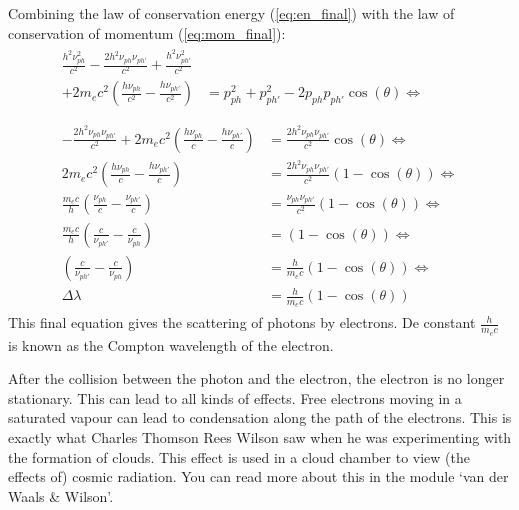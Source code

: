 \documentclass[12pt,a4paper]{article}
\numberwithin{equation}{section}
\numberwithin{figure}{section}
\numberwithin{table}{section}
\begin{document}
Combining the law of conservation energy (\ref{eq:en_final}) with the law of conservation of momentum (\ref{eq:mom_final}):
\begin{align}
\begin{aligned} \nonumber
\frac{h^2\nu^2_{ph}}{c^2} - \frac{2h^2\nu_{ph}\nu_{ph'}}{c^2} + \frac{h^2\nu^2_{ph'}}{c^2} & \\
+ 2m_ec^2 \left( \frac{h\nu_{ph}}{c^2} - \frac{h\nu_{ph'}}{c^2} \right) & = p^2_{ph} + p^2_{ph'} - 2p_{ph}p_{ph'}\cos(\theta) \Longleftrightarrow \\
\end{aligned} \\ 
\begin{aligned}
- \frac{2h^2\nu_{ph}\nu_{ph'}}{c^2} + 2m_ec^2 \left( \frac{h\nu_{ph}}{c} - \frac{h\nu_{ph'}}{c} \right) &= \frac{2h^2 \nu_{ph}\nu_{ph'}}{c^2} \cos(\theta) \Longleftrightarrow\\
2m_ec^2 \left( \frac{h\nu_{ph}}{c} - \frac{h\nu_{ph'}}{c} \right) &= \frac{2h^2 \nu_{ph}\nu_{ph'}}{c^2} \left( 1-\cos(\theta) \right) \Longleftrightarrow\\
\frac{m_ec}{h} \left( \frac{\nu_{ph}}{c} - \frac{\nu_{ph'}}{c} \right) &= \frac{\nu_{ph}\nu_{ph'}}{c^2} \left( 1-\cos(\theta) \right) \Longleftrightarrow\\
\frac{m_ec}{h} \left( \frac{c}{\nu_{ph'}} - \frac{c}{\nu_{ph}} \right) &= \left(  1-\cos(\theta) \right) \Longleftrightarrow\\
\left( \frac{c}{\nu_{ph'}} - \frac{c}{\nu_{ph}} \right) &= \frac{h}{m_ec} \left(  1-\cos(\theta) \right) \Longleftrightarrow\\
\Delta \lambda &= \frac{h}{m_ec} \left( 1-\cos(\theta) \right)
\end{aligned}
\end{align}
This final equation gives the scattering of photons by electrons. De constant $\frac{h}{m_ec}$ is known as the Compton wavelength of the electron.

After the collision between the photon and the electron, the electron is no longer stationary. This can lead to all kinds of effects. Free electrons moving in a saturated vapour can lead to condensation along the path of the electrons. This is exactly what Charles Thomson Rees Wilson saw when he was experimenting with the formation of clouds. This effect is used in a cloud chamber to view (the effects of) cosmic radiation. You can read more about this in the module `van der Waals \& Wilson'.
\end{document}
